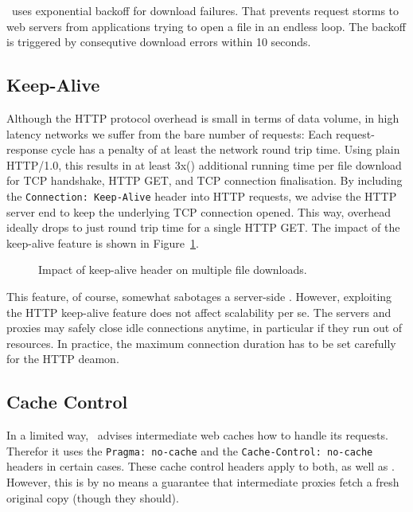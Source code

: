 \cvmfs\ uses exponential backoff for download failures.
That prevents request storms to web servers from applications trying to open a file in an endless loop.
The backoff is triggered by consequtive download errors within 10 seconds.

\subsection{Keep-Alive}
Although the HTTP protocol overhead is small in terms of data volume, in high latency networks we suffer from the bare number of requests: Each request-response cycle has a penalty of at least the network round trip time. 
Using plain HTTP/1.0, this results in at least 3x() additional running time per file download for TCP handshake, HTTP GET, and TCP connection finalisation.
By including the \texttt{Connection:~Keep-Alive} header into HTTP requests, we advise the HTTP server end to keep the underlying TCP connection opened.
This way, overhead ideally drops to just round trip time for a single HTTP GET.
The impact of the keep-alive feature is shown in Figure~\ref{fig:keepalive}.
\begin{figure}
	\begin{center}
		\resizebox{0.5\linewidth}{!}{}
	\end{center}
	\caption{Impact of keep-alive header on multiple file downloads.}
	\label{fig:keepalive}
\end{figure}

This feature, of course, somewhat sabotages a server-side .
However, exploiting the HTTP keep-alive feature does not affect scalability per se. 
The servers and proxies may safely close idle connections anytime, in particular if they run out of resources.
In practice, the maximum connection duration has to be set carefully for the HTTP deamon.

\subsection{Cache Control}
\label{sct:cachecontrol}
In a limited way, \cvmfs\ advises intermediate web caches how to handle its requests.
Therefor it uses the \texttt{Pragma:~no-cache} and the \texttt{Cache-Control:~no-cache} headers in certain cases.
These cache control headers apply to both,  as well as .
However, this is by no means a guarantee that intermediate proxies fetch a fresh original copy (though they should).

